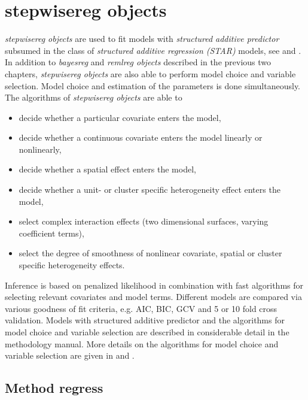 \chapter{stepwisereg objects}
\normalsize
\label{stepwisereg} 

{\em stepwisereg objects} are used to fit models with {\em structured additive predictor} subsumed in the class of {\em
structured additive regression (STAR)} models, see  and . In addition to {\em
bayesreg} and {\em remlreg objects} described in the previous two chapters, {\em stepwisereg objects} are also able to perform
model choice and variable selection. Model choice and estimation of the parameters is done simultaneously. The algorithms of
{\em stepwisereg objects} are able to
\begin{itemize}
\item decide whether a particular covariate enters the model,
\item decide whether a continuous covariate enters the model linearly or nonlinearly,
\item decide whether a spatial effect enters the model,
\item decide whether a unit- or cluster specific heterogeneity effect enters the model,
\item select complex interaction effects (two dimensional surfaces, varying coefficient terms),
\item select the degree of smoothness of  nonlinear covariate, spatial or cluster specific heterogeneity effects.
\end{itemize}
Inference is based on penalized likelihood in combination with fast algorithms for selecting relevant covariates and model
terms. Different models are compared via various goodness of fit criteria, e.g. AIC, BIC, GCV and 5 or 10 fold cross
validation. Models with structured additive predictor and the algorithms for model choice and variable selection are described
in considerable detail in the methodology manual. More details on the algorithms for model choice and variable selection are
given in  and .

     

\clearpage

\section{Method regress}
  \label{stepwiseregregress}

